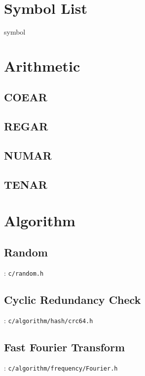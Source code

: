 
\section{Symbol List}
{symbol}

\section{Arithmetic}

\subsection{COEAR}
\subsection{REGAR}
\subsection{NUMAR}
\subsection{TENAR}

\section{Algorithm}

\subsection{Random}
: \verb`c/random.h`

\subsection{Cyclic Redundancy Check}

: \verb`c/algorithm/hash/crc64.h`

\subsection{Fast Fourier Transform}

: \verb`c/algorithm/frequency/Fourier.h`

